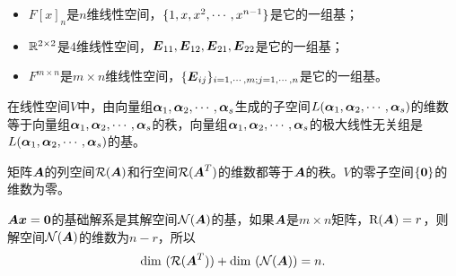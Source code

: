 \begin{frame}

  \vspace{.1in}\pause 
  \begin{li}
    \begin{itemize}
      \item $F[x]_n$是$n$维线性空间，$\{1,x,x^2,\cdots,x^{n-1}\}$是它的一组基；\vspace{.1in}\pause 
      \item $\mathbb R^{2\times 2}$是$4$维线性空间，$\boldsymbol{E}_{11},\boldsymbol{E}_{12},\boldsymbol{E}_{21},\boldsymbol{E}_{22}$是它的一组基；\vspace{.1in}\pause 
      \item $F^{m\times n}$是$m\times n$维线性空间，$\{\boldsymbol{E}_{ij}\}_{i=1,\cdots,m; j=1,\cdots,n}$是它的一组基。
    \end{itemize}
  \end{li}
\end{frame}

\begin{frame}
  在线性空间$V$中，由向量组$\boldsymbol{\alpha}_1,\boldsymbol{\alpha}_2,\cdots,\boldsymbol{\alpha}_s$生成的子空间$L(\boldsymbol{\alpha}_1,\boldsymbol{\alpha}_2,\cdots,\boldsymbol{\alpha}_s)$的维数等于向量组$\boldsymbol{\alpha}_1,\boldsymbol{\alpha}_2,\cdots,\boldsymbol{\alpha}_s$的秩，向量组$\boldsymbol{\alpha}_1,\boldsymbol{\alpha}_2,\cdots,\boldsymbol{\alpha}_s$的极大线性无关组是$L(\boldsymbol{\alpha}_1,\boldsymbol{\alpha}_2,\cdots,\boldsymbol{\alpha}_s)$的基。

  \begin{li}
    矩阵$\boldsymbol{A}$的列空间$\mathcal R(\boldsymbol{A})$和行空间$\mathcal R(\boldsymbol{A}^T)$的维数都等于$\boldsymbol{A}$的秩。$V$的零子空间$\{\M0\}$的维数为零。
  \end{li}
\end{frame}

\begin{frame}
  $\MA\vx = \M0$的基础解系是其解空间$\mathcal N(\boldsymbol{A})$的基，如果$\boldsymbol{A}$是$m\times n$矩阵，$\mathrm{R}(\boldsymbol{A})=r$，则解空间$\mathcal N(\boldsymbol{A})$的维数为$n-r$，所以
  $$
  \mathrm{dim~}(\mathcal R(\boldsymbol{A}^T)) + \mathrm{dim~}(\mathcal N(\boldsymbol{A})) = n. 
  $$
\end{frame}

